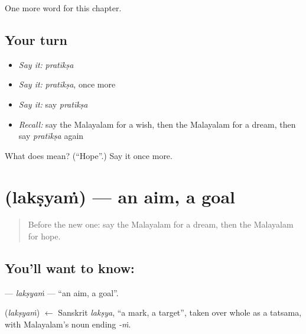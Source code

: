 \begin{grammarlens}[title={What you've built}]
One more word for this chapter.
\end{grammarlens}

\subsection*{Your turn}
\begin{itemize}
\raggedright
  \item \emph{Say it:} \emph{pratīkṣa}
  \item \emph{Say it:} \emph{pratīkṣa}, once more
  \item \emph{Say it:} say \emph{pratīkṣa}
  \item \emph{Recall:} say the Malayalam for a wish, then the Malayalam for a dream, then say \emph{pratīkṣa} again
\end{itemize}

\begin{tcolorbox}[breakable,colback=teal!4,colframe=teal!35!black,title={Before you move on}]
What does  mean? (\textquotedblleft{}Hope\textquotedblright{}.) Say it once more.
\end{tcolorbox}
\section[\texorpdfstring{\ml{ലക്ഷ്യം} (lakṣyaṁ)}{ലക്ഷ്യം (lakṣyaṁ)}]{ (lakṣyaṁ) — an aim, a goal}

\label{lesson:ML-C145-laksyam}



\begin{quote}
Before the new one: say the Malayalam for a dream, then the Malayalam for hope.
\end{quote}

\subsection*{You'll want to know: }
\textbf{} — \emph{lakṣyaṁ} — \textquotedblleft{}an aim, a goal\textquotedblright{}.

\begin{cousinweb}
\textbf{} (\emph{lakṣyaṁ}) $\leftarrow$ Sanskrit \emph{lakṣya}, \textquotedblleft{}a mark, a target\textquotedblright{}, taken over whole as a tatsama, with Malayalam's noun ending \emph{-ṁ}.
\end{cousinweb}

